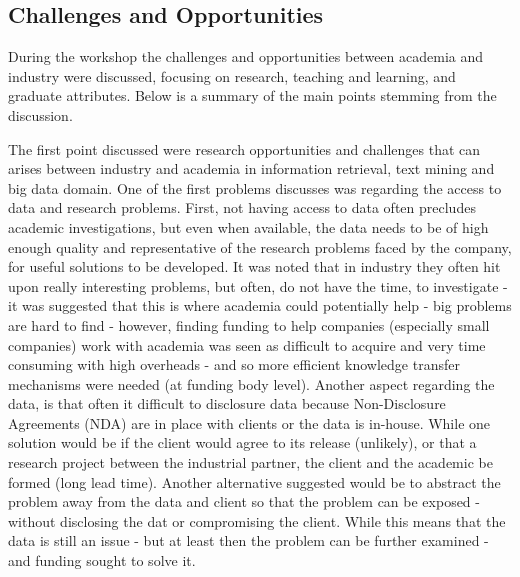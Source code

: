 
\subsection{Challenges and Opportunities}
During the workshop the challenges and opportunities between academia and industry were discussed, focusing on research, teaching and learning, and graduate attributes. Below is a summary of the main points stemming from the discussion.

The first point discussed were research opportunities and challenges that can arises between industry and academia in information retrieval, text mining and big data domain. One of the first problems discusses was regarding the access to data and research problems. First, not having access to data often precludes academic investigations,  but even when available, the data needs to be of high enough quality and representative of the research problems faced by the company, for useful solutions to be developed. It was noted that in industry they often hit upon really interesting problems, but often, do not have the time, to investigate - it was suggested that this is where academia could potentially help - big problems are hard to find - however, finding funding to help companies (especially small companies) work with academia was seen as difficult to acquire and very time consuming with high overheads - and so more efficient knowledge transfer mechanisms were needed (at funding body level). Another aspect regarding the data, is that often it difficult to disclosure data because Non-Disclosure Agreements (NDA) are in place with clients or the data is in-house. While one solution would be if the client would agree to its release (unlikely), or that a research project between the industrial partner, the client and the academic be formed (long lead time). Another alternative suggested would be to abstract the problem away from the data and client so that the problem can be exposed - without disclosing the dat or compromising the client. While this means that the data is still an issue - but at least then the problem can be further examined - and funding sought to solve it. 


